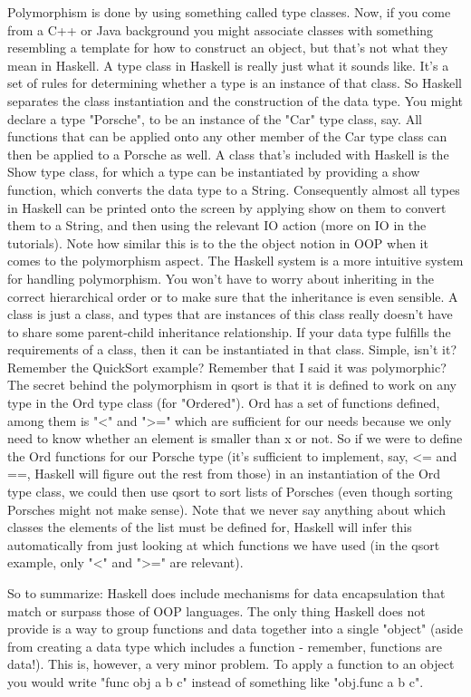 \documentclass[main.tex]{subfiles}
\begin{document}
{{Polymorphism is done by using something called type classes. Now, if you come from a C++ or Java background you might associate classes with something resembling a template for how to construct an object, but that's not what they mean in Haskell. A type class in Haskell is really just what it sounds like. It's a set of rules for determining whether a type is an instance of that class. So Haskell separates the class instantiation and the construction of the data type. You might declare a type "Porsche", to be an instance of the "Car" type class, say. All functions that can be applied onto any other member of the Car type class can then be applied to a Porsche as well. A class that's included with Haskell is the Show type class, for which a type can be instantiated by providing a show function, which converts the data type to a String. Consequently almost all types in Haskell can be printed onto the screen by applying show on them to convert them to a String, and then using the relevant IO action (more on IO in the tutorials). Note how similar this is to the the object notion in OOP when it comes to the polymorphism aspect. The Haskell system is a more intuitive system for handling polymorphism. You won't have to worry about inheriting in the correct hierarchical order or to make sure that the inheritance is even sensible. A class is just a class, and types that are instances of this class really doesn't have to share some parent-child inheritance relationship. If your data type fulfills the requirements of a class, then it can be instantiated in that class. Simple, isn't it? Remember the QuickSort example? Remember that I said it was polymorphic? The secret behind the polymorphism in qsort is that it is defined to work on any type in the Ord type class (for "Ordered"). Ord has a set of functions defined, among them is "<" and ">=" which are sufficient for our needs because we only need to know whether an element is smaller than x or not. So if we were to define the Ord functions for our Porsche type (it's sufficient to implement, say, <= and ==, Haskell will figure out the rest from those) in an instantiation of the Ord type class, we could then use qsort to sort lists of Porsches (even though sorting Porsches might not make sense). Note that we never say anything about which classes the elements of the list must be defined for, Haskell will infer this automatically from just looking at which functions we have used (in the qsort example, only "<" and ">=" are relevant).

So to summarize: Haskell does include mechanisms for data encapsulation that match or surpass those of OOP languages. The only thing Haskell does not provide is a way to group functions and data together into a single "object" (aside from creating a data type which includes a function - remember, functions are data!). This is, however, a very minor problem. To apply a function to an object you would write "func obj a b c" instead of something like "obj.func a b c".


}}
\end{document}
